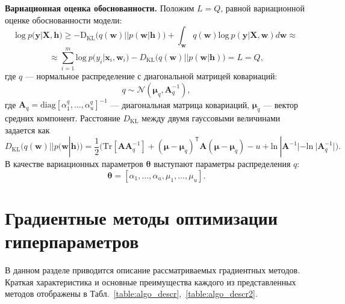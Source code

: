 \textbf{Вариационная оценка обоснованности. }
Положим $L=Q$, равной вариационной оценке обоснованности модели:
\begin{equation} 
\text{log}~p(\mathbf{y}|\mathbf{X},\mathbf{h})  
\geq 
-\text{D}_\text{KL} \bigl(q(\mathbf{w})||p(\mathbf{w}|\mathbf{h})\bigr) + \int_{\mathbf{w}} q(\mathbf{w})\text{log}~{p(\mathbf{y}|\mathbf{X},\mathbf{w})} d \mathbf{w}  \approx
\label{eq:hyper_elbo}
\end{equation}
\[
\approx \sum_{i=1}^m \text{log}~p({y}_i|\mathbf{x}_i, \mathbf{w}_i) - D_\text{KL}\bigl(q (\mathbf{w}) || p (\mathbf{w}|\mathbf{h})\bigr) = L = Q,
\]
где $q$ --- нормальное распределение с диагональной матрицей ковариаций:
\begin{equation}
	q \sim \mathcal{N}(\boldsymbol{\mu}_q, \mathbf{A}^{-1}_q),
\label{eq:diag}
\end{equation}
где $\mathbf{A}_q = \text{diag}[\alpha^q_1, \dots, \alpha^q_u]^{-1}$ --- диагональная матрица ковариаций, $\boldsymbol{\mu}_q$ --- вектор средних компонент.
Расстояние $D_\text{KL}$ между двумя гауссовыми величинами задается как 
\[
	D_\text{KL}\bigl(q (\mathbf{w}) || p (\mathbf{w}|\mathbf{h})\bigr) = \frac{1}{2} \bigl( \text{Tr} [\mathbf{A}\mathbf{A}^{-1}_q] + (\boldsymbol{\mu} - \boldsymbol{\mu}_q)^\mathsf{T}\mathbf{A}(\boldsymbol{\mu} - \boldsymbol{\mu}_q) - u +\text{ln}~|\mathbf{A}^{-1}| - \text{ln}~|\mathbf{A}_q^{-1}| \bigr).
\]
В качестве вариационных параметров $\boldsymbol{\theta}$ выступают параметры распределения $q$:
\[
\boldsymbol{\theta} = [\alpha_1, \dots, \alpha_u, {\mu}_1,\dots,{\mu}_u].
\]




\section{Градиентные методы оптимизации гиперпараметров}
В данном разделе приводится описание рассматриваемых градиентных методов.
Краткая характеристика и основные преимущества каждого из представленных методов отображены в Табл.~\ref{table:algo_descr},~\ref{table:algo_descr2}.



